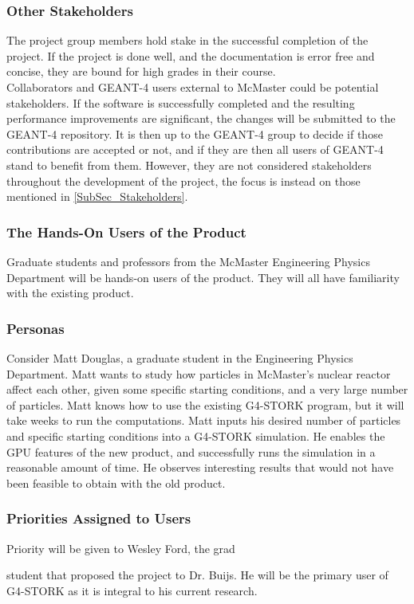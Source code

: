 \documentclass[12pt]{article}
\newcommand{\todo}[1]{\textcolor{red}{[TODO: #1]}} \else
\newcommand{\authornote}[3]{} \newcommand{\todo}[1]{} \fi
\newcommand{\ds}[1]{\authornote{blue}{DS}{#1}} %
\begin{document}
\subsubsection{Other Stakeholders}
The project group members hold stake in the successful completion of the project. If the project is done well, and the documentation is error free and concise, they are bound for high grades in their course.\\

Collaborators and GEANT-4 users external to McMaster could be potential stakeholders. If the software is successfully completed and the resulting performance improvements are significant, the changes will be submitted to the GEANT-4 repository. It is then up to the GEANT-4 group to decide if those contributions are accepted or not, and if they are then all users of GEANT-4 stand to benefit from them. However, they are not considered stakeholders throughout the development of the project, the focus is instead on those mentioned in \ref{SubSec_Stakeholders}.

\subsubsection{The Hands-On Users of the Product}
Graduate students and professors from the McMaster Engineering Physics Department will be hands-on users of the product. They will all have familiarity with the existing product. 

\subsubsection{Personas}
Consider Matt Douglas, a graduate student in the Engineering Physics Department. Matt wants to study how particles in McMaster's nuclear reactor affect each other, given some specific starting conditions, and a very large number of particles. Matt knows how to use the existing G4-STORK program, but it will take weeks to run the computations. Matt inputs his desired number of particles and specific starting conditions into a G4-STORK simulation. He enables the GPU features of the new product, and successfully runs the simulation in a reasonable amount of time. He observes interesting results that would not have been feasible to obtain with the old product.\\

\subsubsection{Priorities Assigned to Users}
Priority will be given to Wesley Ford, the grad
\ds{``graduate"}
student that proposed the project to Dr. Buijs. He will be the primary user of G4-STORK as it is integral to his current research.
\end{document}

